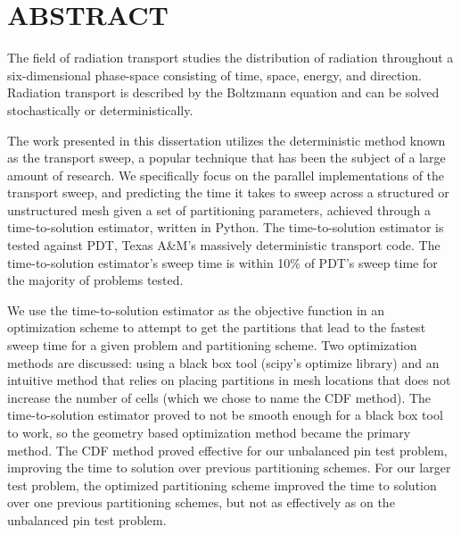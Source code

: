%
%
%
%

\chapter*{ABSTRACT}

\pagestyle{plain} %
\setcounter{page}{2}

\indent The field of radiation transport studies the distribution of radiation throughout a six-dimensional phase-space consisting of time, space, energy, and direction. Radiation transport is described by the Boltzmann equation and can be solved stochastically or deterministically.

The work presented in this dissertation utilizes the deterministic method known as the transport sweep, a popular technique that has been the subject of a large amount of research.
We specifically focus on the parallel implementations of the transport sweep, and predicting the time it takes to sweep across a structured or unstructured mesh given a set of partitioning parameters, achieved through a time-to-solution estimator, written in Python.
The time-to-solution estimator is tested against PDT, Texas A\&M's massively deterministic transport code.
The time-to-solution estimator's sweep time is within 10\% of PDT's sweep time for the majority of problems tested.

We use the time-to-solution estimator as the objective function in an optimization scheme to attempt to get the partitions that lead to the fastest sweep time for a given problem and partitioning scheme.
Two optimization methods are discussed: using a black box tool (scipy's optimize library) and an intuitive method that relies on placing partitions in mesh locations that does not increase the number of cells (which we chose to name the CDF method).
The time-to-solution estimator proved to not be smooth enough for a black box tool to work, so the geometry based optimization method became the primary method.
The CDF method proved effective for our unbalanced pin test problem, improving the time to solution over previous partitioning schemes.
For our larger test problem, the optimized partitioning scheme improved the time to solution over one previous partitioning schemes, but not as effectively as on the unbalanced pin test problem.

\pagebreak{}
